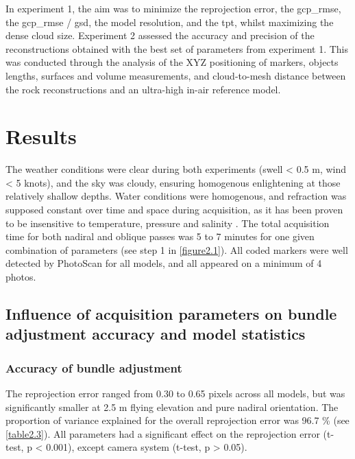 In experiment 1, the aim was to minimize the reprojection error, the \acrshort{gcp_rmse}, the \acrshort{gcp_rmse} / \acrshort{gsd}, the model resolution, and the \acrshort{tpt}, whilst maximizing the dense cloud size. Experiment 2 assessed the accuracy and precision of the reconstructions obtained with the best set of parameters from experiment 1. This was conducted through the analysis of the XYZ positioning of markers, objects lengths, surfaces and volume measurements, and cloud-to-mesh distance between the rock reconstructions and an ultra-high in-air reference model.

\section[Results]{Results}\label{chapitre2_3}
The weather conditions were clear during both experiments (swell < 0.5 m, wind < 5 knots), and the sky was cloudy, ensuring homogenous enlightening at those relatively shallow depths. Water conditions were homogenous, and refraction was supposed constant over time and space during acquisition, as it has been proven to be insensitive to temperature, pressure and salinity \citep{moore_underwater_1976}. The total acquisition time for both nadiral and oblique passes was 5 to 7 minutes for one given combination of parameters (see step 1 in \autoref{figure2.1}). All coded markers were well detected by PhotoScan for all models, and all appeared on a minimum of 4 photos.

\subsection{Influence of acquisition parameters on bundle adjustment accuracy and model statistics}\label{chapitre2_3.1}

\subsubsection{Accuracy of bundle adjustment}\label{chapitre2_3.1.1}
The reprojection error ranged from 0.30 to 0.65 pixels across all models, but was significantly smaller at 2.5 m flying elevation and pure nadiral orientation. The proportion of variance explained for the overall reprojection error was 96.7 \% (see \autoref{table2.3}). All parameters had a significant effect on the reprojection error (t-test, p < 0.001), except camera system (t-test, p > 0.05). 


